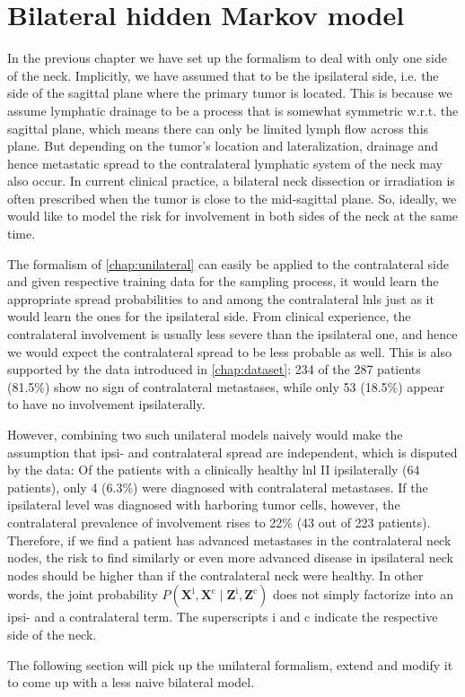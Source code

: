 \documentclass[\relativeRoot/main.tex]{subfiles}
\begin{document}
\chapter{Bilateral hidden Markov model}
\label{chap:bilateral}

In the previous chapter we have set up the formalism to deal with only one side of the neck. Implicitly, we have assumed that to be the ipsilateral side, i.e. the side of the sagittal plane where the primary tumor is located. This is because we assume lymphatic drainage to be a process that is somewhat symmetric w.r.t. the sagittal plane, which means there can only be limited lymph flow across this plane. But depending on the tumor's location and lateralization, drainage and hence metastatic spread to the contralateral lymphatic system of the neck may also occur. In current clinical practice, a bilateral neck dissection or irradiation is often prescribed when the tumor is close to the mid-sagittal plane. So, ideally, we would like to model the risk for involvement in both sides of the neck at the same time.

The formalism of \cref{chap:unilateral} can easily be applied to the contralateral side and given respective training data for the sampling process, it would learn the appropriate spread probabilities to and among the contralateral \glspl{lnl} just as it would learn the ones for the ipsilateral side. From clinical experience, the contralateral involvement is usually less severe than the ipsilateral one, and hence we would expect the contralateral spread to be less probable as well. This is also supported by the data introduced in \cref{chap:dataset}: 234 of the 287 patients (81.5\%) show no sign of contralateral metastases, while only 53 (18.5\%) appear to have no involvement ipsilaterally.

However, combining two such unilateral models naively would make the assumption that ipsi- and contralateral spread are independent, which is disputed by the data: Of the patients with a clinically healthy \gls{lnl} II ipsilaterally (64 patients), only 4 (6.3\%) were diagnosed with contralateral metastases. If the ipsilateral level was diagnosed with harboring tumor cells, however, the contralateral prevalence of involvement rises to 22\% (43 out of 223 patients). Therefore, if we find a patient has advanced metastases in the contralateral neck nodes, the risk to find similarly or even more advanced disease in ipsilateral neck nodes should be higher than if the contralateral neck were healthy. In other words, the joint probability $P \left( \mathbf{X}^\text{i}, \mathbf{X}^\text{c} \mid \mathbf{Z}^\text{i}, \mathbf{Z}^\text{c} \right)$ does not simply factorize into an ipsi- and a contralateral term. The superscripts $\text{i}$ and $\text{c}$ indicate the respective side of the neck.

The following section will pick up the unilateral formalism, extend and modify it to come up with a less naive bilateral model.




\end{document}
